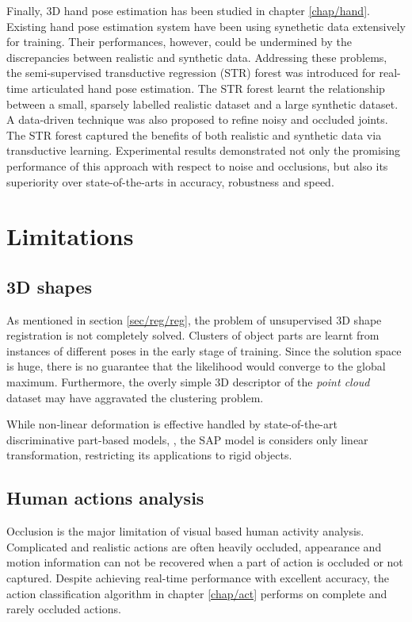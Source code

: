 Finally, 3D hand pose estimation has been studied in chapter \ref{chap/hand}. 
Existing hand pose estimation system have been using synethetic data extensively for training. Their performances, however, could be undermined by the discrepancies between realistic and synthetic data. Addressing these problems, the semi-supervised transductive regression (STR) forest was introduced for real-time articulated hand pose estimation. The STR forest learnt the relationship between a small, sparsely labelled realistic dataset and a large synthetic dataset. A data-driven technique was also proposed to refine noisy and occluded joints. The STR forest captured the benefits of both realistic and synthetic data via transductive learning. 
Experimental results demonstrated not only the promising performance of this approach with respect to noise and occlusions, but also its superiority over state-of-the-arts in accuracy, robustness and speed.

\section{Limitations}

\subsection{3D shapes} 

As mentioned in section \ref{sec/reg/reg}, the problem of unsupervised 3D shape registration is not completely solved. Clusters of object parts are learnt from instances of different poses in the early stage of training. Since the solution space is huge, there is no guarantee that the likelihood would converge to the global maximum. Furthermore, the overly simple 3D descriptor of the \emph{point cloud} dataset may have aggravated the clustering problem.   

While non-linear deformation is effective handled by state-of-the-art discriminative part-based models, \eg \cite{Felzenszwalb2010, Andriluka2009, Pishchulin2012}, the SAP model is considers only linear transformation, restricting its applications to rigid objects. 

\subsection{Human actions analysis} 

Occlusion is the major limitation of visual based human activity analysis. 
Complicated and realistic actions are often heavily occluded, appearance and motion information can not be recovered when a part of action is occluded or not captured. Despite achieving real-time performance with excellent accuracy, the action classification algorithm in chapter \ref{chap/act} performs on complete and rarely occluded actions. 

